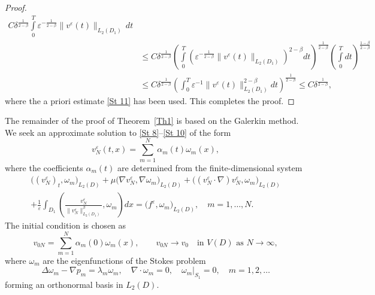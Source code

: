 \documentclass[11pt]{article}
\begin{document}
\begin{proof}
\begin{align*}
	C \delta^{\frac{1}{2-\beta}} \int\limits_0^{T} \varepsilon^{-\frac{1}{2-\beta}} \|v^{\varepsilon}(t)\|_{L_2(D_1)} \, dt \\
	&\leq C \delta^{\frac{1}{2-\beta}} \left( \int\limits_0^{T} \left( \varepsilon^{-\frac{1}{2-\beta}} \|v^{\varepsilon}(t)\|_{L_2(D_1)} \right)^{2-\beta} dt \right)^{\frac{1}{2-\beta}} \left( \int\limits_0^{T} dt \right)^{\frac{1-\beta}{2-\beta}}\\
	&\leq C \delta^{\frac{1}{2-\beta}} \left( \int_{0}^{T} \varepsilon^{-1} \|v^{\varepsilon}(t) \|^{2-\beta}_{L_2 (D_1)} dt \right)^{\frac{1}{2-\beta}} \leq C \delta^{\frac{1}{2-\beta}},
\end{align*}
	where the a priori estimate \eqref{St 11} has been used.  
	This completes the proof.
\end{proof}

\medskip
The remainder of the proof of Theorem~\ref{Th1} is based on the Galerkin method.  
We seek an approximate solution to \eqref{St 8}--\eqref{St 10} of the form
\[
v_{N}^{\varepsilon}(t,x) = \sum_{m=1}^{N} \alpha_{m}(t)\omega_{m}(x),
\]
where the coefficients $\alpha_{m}(t)$ are determined from the finite-dimensional system
\begin{multline} \label{St 13}
		\big( (v_{N}^\varepsilon )_{t}, \omega_m \big)_{L_2(D)} 
		+ \mu \big( \nabla v_{N}^\varepsilon , \nabla \omega_m \big)_{L_2(D)} 
		+ \big( (v_{N}^\varepsilon \cdot \nabla) v_{N}^\varepsilon, \omega_m \big)_{L_2(D)} \\
		+ \frac{1}{\varepsilon} \int_{D_1} 
		\left( \frac{v_{N}^\varepsilon}{\| v_{N}^\varepsilon \|_{L_2(D_1)}^\beta}, \omega_m \right) dx 
		= \big( f^\varepsilon, \omega_m \big)_{L_2(D)}, \quad m = 1, \dots, N.
\end{multline}
The initial condition is chosen as
\begin{equation} \label{St 14}
	v_{0N} = \sum_{m=1}^{N} \alpha_m(0) \omega_m(x), \qquad v_{0N} \to v_0 \quad \text{in } V(D) \text{ as } N \to \infty,
\end{equation}
where $\omega_m$ are the eigenfunctions of the Stokes problem
\[
\Delta \omega_m - \nabla p_m = \lambda_m \omega_m, 
\quad \nabla \cdot \omega_m = 0, 
\quad \omega_m|_{S_1} = 0, 
\quad m = 1, 2, \ldots
\]
forming an orthonormal basis in $L_2(D)$.
\end{document}
